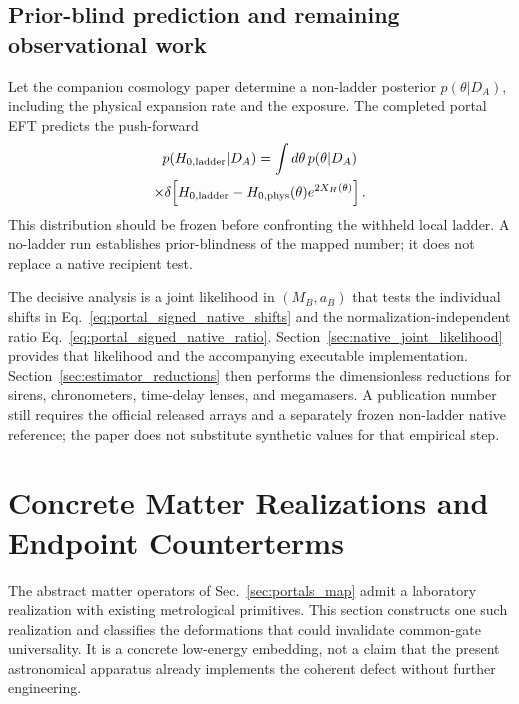 \documentclass[aps,prd,twocolumn,10pt,superscriptaddress,nofootinbib]{revtex4-2}
\begin{document}
\subsection{Prior-blind prediction and remaining observational work}
\label{sec:portal_statistical_interface}

Let the companion cosmology paper determine a non-ladder posterior
$p(\theta|D_A)$, including the physical expansion rate and the exposure.
The completed portal EFT predicts the push-forward
\begin{multline}
 p(H_{0,\rm ladder}|D_A)
 =\int d\theta\,p(\theta|D_A)\\
 \times\delta\!\left[
 H_{0,\rm ladder}-H_{0,\rm phys}(\theta)
 e^{2X_H(\theta)}
 \right].
 \label{eq:pb_pushforward}
\end{multline}
This distribution should be frozen before confronting the withheld local
ladder.  A no-ladder run establishes prior-blindness of the mapped number;
it does not replace a native recipient test.

The decisive analysis is a joint likelihood in $(M_B,a_B)$ that tests the
individual shifts in Eq.~\eqref{eq:portal_signed_native_shifts} and the
normalization-independent ratio
Eq.~\eqref{eq:portal_signed_native_ratio}.  Section~\ref{sec:native_joint_likelihood}
provides that likelihood and the accompanying executable implementation.
Section~\ref{sec:estimator_reductions} then performs the dimensionless
reductions for sirens, chronometers, time-delay lenses, and megamasers.  A
publication number still requires the official released arrays and a
separately frozen non-ladder native reference; the paper does not substitute
synthetic values for that empirical step.



\section{Concrete Matter Realizations and Endpoint Counterterms}
\label{sec:concrete_matter_realizations}

The abstract matter operators of Sec.~\ref{sec:portals_map} admit a
laboratory realization with existing metrological primitives.  This section
constructs one such realization and classifies the deformations that could
invalidate common-gate universality.  It is a concrete low-energy embedding,
not a claim that the present astronomical apparatus already implements the
coherent defect without further engineering.
\end{document}
